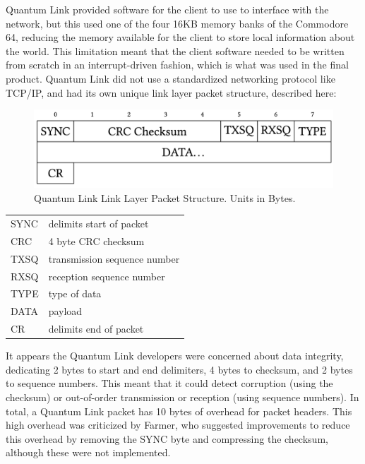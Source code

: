 Quantum Link provided software for the client to use to interface with the network, but this used one of the four 16KB memory banks of the Commodore 64, reducing the memory available for the client to store local information about the world. This limitation meant that the client software needed to be written from scratch in an interrupt-driven fashion, which is what was used in the final product. Quantum Link did not use a standardized networking protocol like TCP/IP, and had its own unique link layer packet structure, described here:

\begin{figure}[h]
  \includegraphics[scale=0.18]{figures/QLink-Diagram}
  \caption{Quantum Link Link Layer Packet Structure. Units in Bytes.}
\end{figure}

\begin{table}[h]
  \begin{tabular}{l l}
    SYNC& delimits start of packet\\
    CRC& 4 byte CRC checksum\\
    TXSQ& transmission sequence number\\
    RXSQ& reception sequence number\\
    TYPE& type of data\\
    DATA& payload\\
    CR& delimits end of packet
  \end{tabular}
\end{table}

It appears the Quantum Link developers were concerned about data integrity, dedicating 2 bytes to start and end delimiters, 4 bytes to checksum, and 2 bytes to sequence numbers. This meant that it could detect corruption (using the checksum) or out-of-order transmission or reception (using sequence numbers). In total, a Quantum Link packet has 10 bytes of overhead for packet headers. This high overhead was criticized by Farmer, who suggested improvements to reduce this overhead by removing the SYNC byte and compressing the checksum, although these were not implemented.

